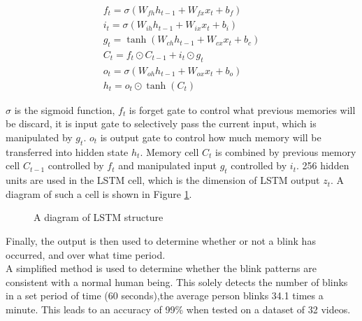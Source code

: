 \documentclass{article}
\begin{document}
\begin{equation}\begin{array} { l } { f _ { t } = \sigma \left(W _ { f h } h _ { t - 1 } + W _ { f x } x _ { t } + b _ { f } \right) } \\ { i _ { t } = \sigma \left(W _ { i h } h _ { t - 1 } + W _ { i x } x _ { t } + b _ { i } \right) } \\ { g _ { t } = \tanh \left(W _ { c h } h _ { t - 1 } + W _ { c x } x _ { t } + b _ { c } \right) } \\ { C _ { t } = f _ { t } \odot C _ { t - 1 } + i _ { t } \odot g _ { t } } \\ { o _ { t } = \sigma \left(W _ { o h } h _ { t - 1 } + W _ { o x } x _ { t } + b _ { o } \right) } \\ { h _ { t } = o _ { t } \odot \tanh \left(C _ { t } \right) } \end{array}\end{equation}

$\sigma$ is the sigmoid function, $f_t$ is forget gate to control what previous memories will be discard, it is input gate to selectively pass the current input, which is manipulated by $g_t$. $o_t$ is output gate to control how much memory will be transferred into hidden state $h_t$. Memory cell $C_t$ is combined by previous memory cell $C_{t-1}$ controlled by $f_t$ and manipulated input $g_t$ controlled by $i_t$. 256 hidden units are used in the LSTM cell, which is the dimension of LSTM output $z_t$\cite{ictuoculi}. A diagram of such a cell is shown in Figure \ref{fig:LSTM}.

\begin{figure}[H]
    \centering
    \caption{A diagram of LSTM structure\cite{ictuoculi}}
    \label{fig:LSTM}
\end{figure}

Finally, the output is then used to determine whether or not a blink has occurred, and over what time period.\\

A simplified method is used to determine whether the blink patterns are consistent with a normal human being. This solely detects the number of blinks in a set period of time (60 seconds),the average person blinks 34.1 times a minute. This leads to an accuracy of 99\% when tested on a dataset of 32 videos.
\end{document}
